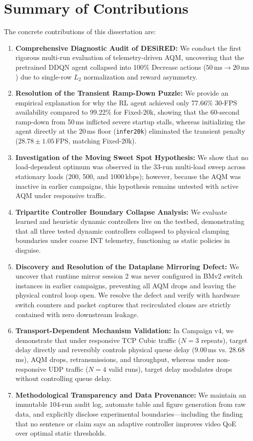 \documentclass[12pt,a4paper,oneside]{report}
\begin{document}
\section{Summary of Contributions}
The concrete contributions of this dissertation are:
\begin{enumerate}[label=\arabic*.]
  \item \textbf{Comprehensive Diagnostic Audit of DESiRED:} We conduct the first rigorous multi-run evaluation of telemetry-driven AQM, uncovering that the pretrained DDQN agent collapsed into 100\% Decrease actions ($50\,\text{ms} \to 20\,\text{ms}$) due to single-row $L_2$ normalization and reward asymmetry.
  \item \textbf{Resolution of the Transient Ramp-Down Puzzle:} We provide an empirical explanation for why the RL agent achieved only 77.66\% 30-FPS availability compared to 99.22\% for Fixed-20k, showing that the 60-second ramp-down from 50\,ms inflicted severe startup stalls, whereas initializing the agent directly at the 20\,ms floor (\texttt{infer20k}) eliminated the transient penalty ($28.78 \pm 1.05$\,FPS, matching Fixed-20k).
  \item \textbf{Investigation of the Moving Sweet Spot Hypothesis:} We show that no load-dependent optimum was observed in the 33-run multi-load sweep across stationary loads (200, 500, and 1000\,kbps); however, because the AQM was inactive in earlier campaigns, this hypothesis remains untested with active AQM under responsive traffic.
  \item \textbf{Tripartite Controller Boundary Collapse Analysis:} We evaluate learned and heuristic dynamic controllers live on the testbed, demonstrating that all three tested dynamic controllers collapsed to physical clamping boundaries under coarse INT telemetry, functioning as static policies in disguise.
  \item \textbf{Discovery and Resolution of the Dataplane Mirroring Defect:} We uncover that runtime mirror session 2 was never configured in BMv2 switch instances in earlier campaigns, preventing all AQM drops and leaving the physical control loop open. We resolve the defect and verify with hardware switch counters and packet captures that recirculated clones are strictly contained with zero downstream leakage.
  \item \textbf{Transport-Dependent Mechanism Validation:} In Campaign v4, we demonstrate that under responsive TCP Cubic traffic ($N=3$ repeats), target delay directly and reversibly controls physical queue delay ($9.00$\,ms vs. $28.68$\,ms), AQM drops, retransmissions, and throughput, whereas under non-responsive UDP traffic ($N=4$ valid runs), target delay modulates drops without controlling queue delay.
  \item \textbf{Methodological Transparency and Data Provenance:} We maintain an immutable 104-run audit log, automate table and figure generation from raw data, and explicitly disclose experimental boundaries—including the finding that no sentence or claim says an adaptive controller improves video QoE over optimal static thresholds.
\end{enumerate}
\end{document}
